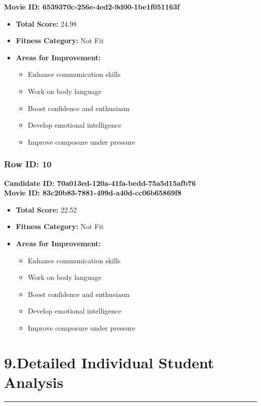 \documentclass{article}
\begin{document}
\textbf{Movie ID: 6539370c-256e-4ed2-9d00-1be1f051163f}
\begin{itemize}
    \item \textbf{Total Score:} 24.98
    \item \textbf{Fitness Category:} Not Fit
    \item \textbf{Areas for Improvement:}
    \begin{itemize}
        \item Enhance communication skills
        \item Work on body language
        \item Boost confidence and enthusiasm
        \item Develop emotional intelligence
        \item Improve composure under pressure
    \end{itemize}
\end{itemize}

\subsubsection{Row ID: 10}
\textbf{Candidate ID: 70a013ed-120a-41fa-bedd-75a5d15afb76}\\

\textbf{Movie ID: 83c20b83-7881-499d-a40d-cc06b65869f8}
\begin{itemize}
    \item \textbf{Total Score:} 22.52
    \item \textbf{Fitness Category:} Not Fit
    \item \textbf{Areas for Improvement:}
    \begin{itemize}
        \item Enhance communication skills
        \item Work on body language
        \item Boost confidence and enthusiasm
        \item Develop emotional intelligence
        \item Improve composure under pressure
    \end{itemize}
\end{itemize}


\newpage

\section{9.Detailed Individual Student Analysis}
  \begin{center}
        \color{red}\rule{1\linewidth}{1mm}
    \end{center}
\end{document}
